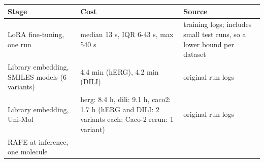 \documentclass[
  10pt,
]{article}
\begin{document}
\begin{longtable}[]{@{}lll@{}}
\toprule
\begin{minipage}[b]{0.30\columnwidth}\raggedright
Stage\strut
\end{minipage} & \begin{minipage}[b]{0.30\columnwidth}\raggedright
Cost\strut
\end{minipage} & \begin{minipage}[b]{0.30\columnwidth}\raggedright
Source\strut
\end{minipage}\tabularnewline
\midrule
\endhead
\begin{minipage}[t]{0.30\columnwidth}\raggedright
LoRA fine-tuning, one run\strut
\end{minipage} & \begin{minipage}[t]{0.30\columnwidth}\raggedright
median 13 s, IQR 6-43 s, max 540 s\strut
\end{minipage} & \begin{minipage}[t]{0.30\columnwidth}\raggedright
training logs; includes small test runs, so a lower bound per
dataset\strut
\end{minipage}\tabularnewline
\begin{minipage}[t]{0.30\columnwidth}\raggedright
Library embedding, SMILES models (6 variants)\strut
\end{minipage} & \begin{minipage}[t]{0.30\columnwidth}\raggedright
4.4 min (hERG), 4.2 min (DILI)\strut
\end{minipage} & \begin{minipage}[t]{0.30\columnwidth}\raggedright
original run logs\strut
\end{minipage}\tabularnewline
\begin{minipage}[t]{0.30\columnwidth}\raggedright
Library embedding, Uni-Mol\strut
\end{minipage} & \begin{minipage}[t]{0.30\columnwidth}\raggedright
herg: 8.4 h, dili: 9.1 h, caco2: 1.7 h (hERG and DILI: 2 variants each;
Caco-2 rerun: 1 variant)\strut
\end{minipage} & \begin{minipage}[t]{0.30\columnwidth}\raggedright
original run logs\strut
\end{minipage}\tabularnewline
\begin{minipage}[t]{0.30\columnwidth}\raggedright
RAFE at inference, one molecule\strut
\end{minipage} & \begin{minipage}[t]{0.30\columnwidth}\raggedright

\end{minipage}
\end{longtable}
\end{document}
